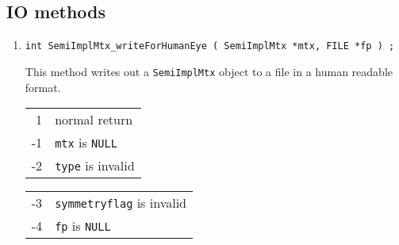\subsection{IO methods}
\label{subsection:SemiImplMtx:proto:IO}
\par
\begin{enumerate}
\item
\begin{verbatim}
int SemiImplMtx_writeForHumanEye ( SemiImplMtx *mtx, FILE *fp ) ;
\end{verbatim}
\par
This method writes out a {\tt SemiImplMtx} object to a file in a 
human readable format.
\par {}
\begin{center}
\begin{tabular}{rl}
 1 & normal return \\
-1 & {\tt mtx} is {\tt NULL} \\
-2 & {\tt type} is invalid \\
\end{tabular}
\quad
\begin{tabular}{rl}
-3 & {\tt symmetryflag} is invalid \\
-4 & {\tt fp} is {\tt NULL}
\end{tabular}
\end{center}
\end{enumerate}
